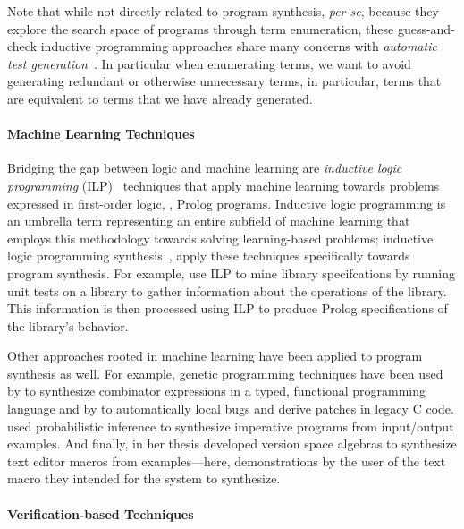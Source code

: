 Note that while not directly related to program synthesis, \emph{per se}, because they explore the search space of programs through term enumeration, these guess-and-check inductive programming approaches share many concerns with \emph{automatic test generation}~\citep{claessen-flp-2014, grygiel-jfp-2013, yakushev-aaip-2010}.
In particular when enumerating terms, we want to avoid generating redundant or otherwise unnecessary terms, in particular, terms that are equivalent to terms that we have already generated.

\paragraph{Machine Learning Techniques}

Bridging the gap between logic and machine learning are \emph{inductive logic programming} (ILP)~\citep{muggleton-jlp-1994} techniques that apply machine learning towards problems expressed in first-order logic, \ie, Prolog programs.
Inductive logic programming is an umbrella term representing an entire subfield of machine learning that employs this methodology towards solving learning-based problems; inductive logic programming synthesis~\citep{flener-jlp-1999}, apply these techniques specifically towards program synthesis.
For example, \citet{sankaranarayanan-icse-2008} use ILP to mine library specifcations by running unit tests on a library to gather information about the operations of the library.
This information is then processed using ILP to produce Prolog specifications of the library's behavior.

Other approaches rooted in machine learning have been applied to program synthesis as well.
For example, genetic programming techniques have been used by \citet{briggs-kes-2008} to synthesize combinator expressions in a typed, functional programming language and by \citet{weimer-icse-2009} to automatically local bugs and derive patches in legacy C code.
\citet{gulwani-popl-2007} used probabilistic inference to synthesize imperative programs from input/output examples.
And finally, \citet{lau-thesis-2001} in her thesis developed version space algebras to synthesize text editor macros from examples---here, demonstrations by the user of the text macro they intended for the system to synthesize.

\paragraph{Verification-based Techniques}

